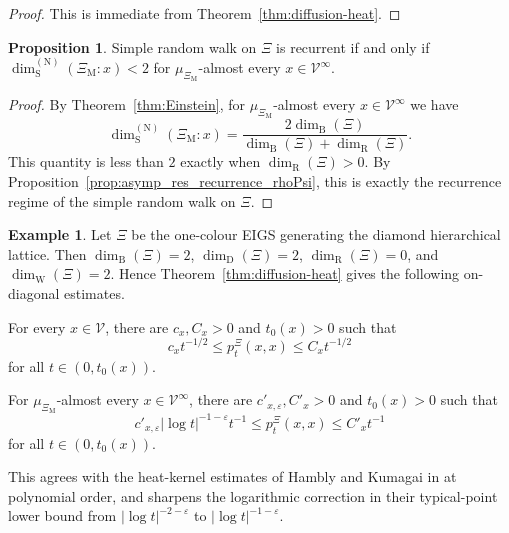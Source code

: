 \documentclass{article}
\theoremstyle{plain}
\theoremstyle{definition}
\newtheorem{example}[theorem]{Example}
\newtheorem{proposition}[theorem]{Proposition}
\newcommand{\dimbox}{\dim_\mathrm{B}}
\newcommand{\dimdeg}{\dim_\mathrm{D}}
\newcommand{\dimwalk}{\dim_\mathrm{W}}
\newcommand{\dimresis}{\dim_\mathrm{R}}
\newcommand{\dimspec}{\dim_\mathrm{S}}
\begin{document}
\begin{proof}
This is immediate from Theorem~\ref{thm:diffusion-heat}.
\end{proof}

\begin{proposition}\label{prop:final_recurrent}
Simple random walk on $\Xi$ is recurrent if and only if $\dimspec^{(\mathrm N)}(\Xi_{\mathrm M}:x)<2$ for $\mu_{\Xi_{\mathrm M}}$-almost every $x\in \mathscr V^\infty$.
\end{proposition}

\begin{proof}
By Theorem~\ref{thm:Einstein}, for $\mu_{\Xi_{\mathrm M}}$-almost every $x\in \mathscr V^\infty$ we have
\[
\dimspec^{(\mathrm N)}(\Xi_{\mathrm M}:x)
=
\frac{2\dimbox(\Xi)}{\dimbox(\Xi)+\dimresis(\Xi)}.
\]
This quantity is less than $2$ exactly when $\dimresis(\Xi)>0$.
By Proposition~\ref{prop:asymp_res_recurrence_rhoPsi}, this is exactly the recurrence regime of the simple random walk on $\Xi$.
\end{proof}

\begin{example}
Let $\Xi$ be the one-colour EIGS generating the diamond hierarchical lattice.
Then $\dimbox(\Xi)=2$, $\dimdeg(\Xi)=2$, $\dimresis(\Xi)=0$, and $\dimwalk(\Xi)=2$.
Hence Theorem~\ref{thm:diffusion-heat} gives the following on-diagonal estimates.

For every $x\in\mathscr V$, there are $c_x,C_x>0$ and $t_0(x)>0$ such that
\[
c_x t^{-1/2}\le p_t^\Xi(x,x)\le C_x t^{-1/2}
\]
for all $t\in(0,t_0(x))$.

For $\mu_{\Xi_{\mathrm M}}$-almost every $x\in\mathscr V^\infty$, there are $c'_{x,\varepsilon},C'_x>0$ and $t_0(x)>0$ such that
\[
c'_{x,\varepsilon}|\log t|^{-1-\varepsilon}t^{-1}
\le
p_t^\Xi(x,x)
\le
C'_x t^{-1}
\]
for all $t\in(0,t_0(x))$.

This agrees with the heat-kernel estimates of Hambly and Kumagai in \cite{hambly2010diffusion} at polynomial order, and sharpens the logarithmic correction in their typical-point lower bound from $|\log t|^{-2-\varepsilon}$ to $|\log t|^{-1-\varepsilon}$.
\end{example}

\end{document}
